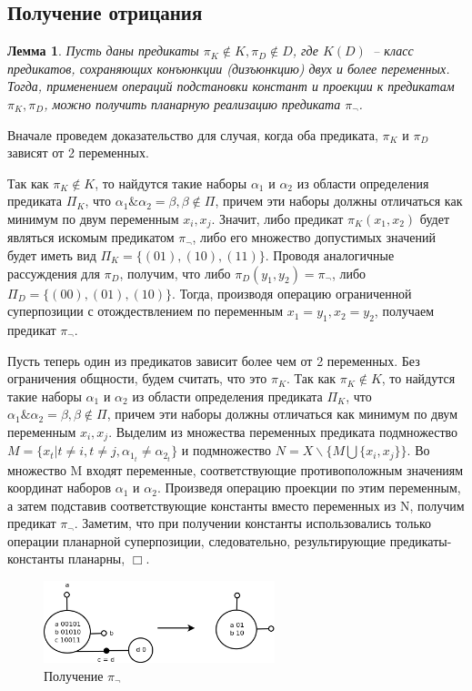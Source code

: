 \documentclass[12pt]{extarticle}
\newtheorem{lemma}[theorem]{Лемма}
\newenvironment{proof}[1][Доказательство.]{\begin{trivlist}
\item[\hskip \labelsep {\bfseries #1}]}{\end{trivlist}}
\begin{document}
\subsection{Получение отрицания}
\begin{lemma}
\label{eq:negate}
Пусть даны предикаты $\pi_K \notin K, \pi_D \notin D$, где $K (D)$~-- класс предикатов, 
сохраняющих конъюнкции (дизъюнкцию) двух и более переменных.
Тогда, применением операций подстановки констант и проекции
к предикатам $\pi_K, \pi_D$, можно получить планарную реализацию предиката $\pi_{\neg}$.
\end{lemma}

\begin{proof}
Вначале проведем доказательство для случая, когда оба предиката, $\pi_K$ и $\pi_D$ зависят от 2 переменных.

Так как $\pi_K \notin K$, то найдутся такие наборы $\alpha_1$ и $\alpha_2$ из области определения предиката $\Pi_K$, что
$\alpha_1\&\alpha_2=\beta, \beta \notin \Pi$, причем эти наборы должны отличаться как минимум по двум переменным $x_i, x_{j}$.
Значит, либо предикат $\pi_K(x_1, x_2)$ будет являться искомым предикатом $\pi_{\neg}$, либо его множество
допустимых значений будет иметь вид $\Pi_K = \{ (01), (10), (11) \}$. 
Проводя аналогичные рассуждения для $\pi_D$, получим, что либо $\pi_D(y_1, y_2) = \pi_{\neg}$, либо $\Pi_D = \{ (00), (01), (10) \}$.
Тогда, производя операцию ограниченной суперпозиции с отождествлением по переменным $x_1=y_1, x_2=y_2$, получаем
предикат $\pi_{\neg}$.

Пусть теперь один из предикатов зависит более чем от 2 переменных. Без ограничения общности, будем считать, что это $\pi_K$.
Так как $\pi_K \notin K$, то найдутся такие наборы $\alpha_1$ и $\alpha_2$ из области определения предиката $\Pi_K$, что
$\alpha_1\&\alpha_2=\beta, \beta \notin \Pi$, причем эти наборы должны отличаться как минимум по двум переменным $x_i, x_{j}$.
Выделим из множества переменных предиката подмножество $M = \{ x_t | t \neq i, t \neq j, \alpha_{1_t} \neq \alpha_{2_t} \}$ и 
подмножество $N = X \backslash \{ M \bigcup \{x_i, x_j\} \}$.
Во множество M входят переменные, соответствующие противоположным значениям координат наборов $\alpha_1$ и $\alpha_2$.
Произведя операцию проекции по этим переменным, а затем подставив соответствующие
константы вместо переменных из N, получим предикат $\pi_{\neg}$.
Заметим, что при получении константы использовались только операции планарной суперпозиции, следовательно, 
результирующие предикаты-константы планарны, $\Box$.
\end{proof}
\begin{figure}[htb]
\centering
\includegraphics[width=0.6\textwidth]{negate.png}
\caption{Получение $\pi_{\neg}$}
\label{fig:negation}
\end{figure}
\end{document}
